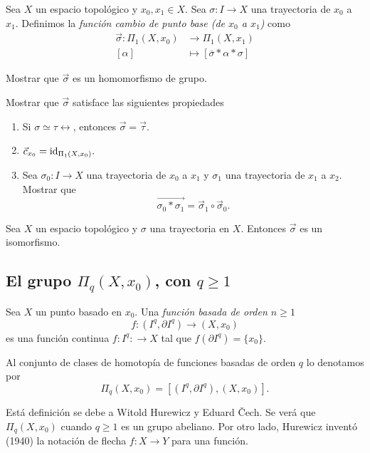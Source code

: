     \begin{definicion}
        Sea $X$ un espacio topológico y $x_0,x_1\in X$. Sea $\sigma:I\to X$ una trayectoria de $x_0$ a $x_1$. Definimos la \textit{función cambio de punto base (de $x_0$ a $x_1$)} como
        \begin{align*}
            \Vec{\sigma}:\Pi_1(X,x_0)&\to\Pi_1(X,x_1)\\
            [\alpha]&\mapsto[\overline{\sigma}*\alpha*\sigma]
        \end{align*}
    \end{definicion}
    \begin{ejercicio}
        Mostrar que $\Vec{\sigma}$ es un homomorfismo de grupo.
    \end{ejercicio}
    \begin{ejercicio}
        Mostrar que $\Vec{\sigma}$ satisface las siguientes propiedades
        \begin{enumerate}
            \item[(1)] Si $\sigma\simeq\tau\rel$, entonces $\Vec{\sigma}=\Vec{\tau}.$
            \item[(2)] $\Vec{c}_{x_0}=\mathrm{id}_{\Pi_1(X,x_0)}.$ 
            \item[(3)]  Sea $\sigma_0:I\to X$ una trayectoria de $x_0$ a $x_1$ y $\sigma_1$ una trayectoria de $x_1$ a $x_2$. Mostrar que $$\overrightarrow{\sigma_0*\sigma_1}=\Vec{\sigma}_1\circ \Vec{\sigma}_0.$$
        \end{enumerate}
    \end{ejercicio}
    \begin{coro}
    \label{coro:iso_espacios_basados}
        Sea $X$ un espacio topológico y $\sigma$ una trayectoria en $X$. Entonces $\Vec{\sigma}$ es un isomorfismo.
    \end{coro}

    \subsection{El grupo \texorpdfstring{$\Pi_q(X,x_0)$}{Pi_q},  con \texorpdfstring{$q\geq 1$}{q>1}}
    
    \begin{definicion}
        Sea $X$ un punto basado en $x_0$. Una \textit{función basada de orden $n\geq 1$} 
        $$f:(I^q,\partial I^q)\to (X,x_0)$$ 
        es una función continua $f:I^q:\to X$ tal que $f(\partial I^q)=\{x_0\}$. 
    \end{definicion}
    \begin{definicion}
    \label{def:Pi_q(X,x0)}
        Al conjunto de clases de homotopía de funciones basadas de orden $q$ lo denotamos por 
        $$\Pi_q(X,x_0)=[(I^q,\partial I^q),(X,x_0)].$$
    \end{definicion}
    Está definición se debe a Witold Hurewicz y Eduard Čech. Se verá que $\Pi_q(X,x_0)$ cuando $q\geq 1$ es un grupo abeliano. Por otro lado, Hurewicz inventó (1940) la notación de flecha $f:X\to Y$ para una función.

